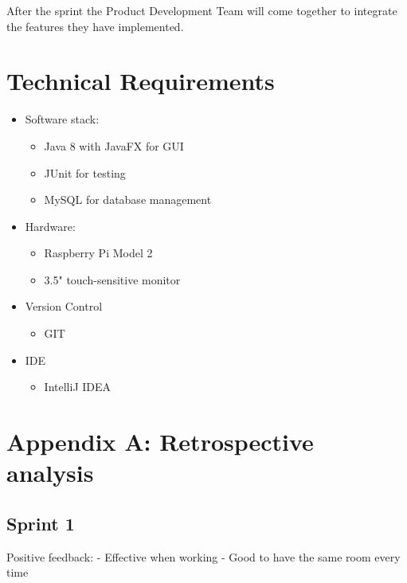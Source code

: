 \documentclass[a4paper,12pt]{article}
\begin{document}
After the sprint the Product Development Team will come together to integrate the features they have implemented.

\section{Technical Requirements}
\begin{itemize}
	\item Software stack:
	\begin{itemize}
		\item Java 8 with JavaFX for GUI
		\item JUnit for testing
		\item MySQL for database management
	\end{itemize}
	\item Hardware:
	\begin{itemize}
		\item Raspberry Pi Model 2
		\item 3.5" touch-sensitive monitor
	\end{itemize}
	\item Version Control
	\begin{itemize}
		\item GIT
	\end{itemize}
	\item IDE
	\begin{itemize}
		\item IntelliJ IDEA
	\end{itemize}
\end{itemize}

\section{Appendix A: Retrospective analysis}
\subsection{Sprint 1}
Positive feedback:
 - Effective when working
 - Good to have the same room every time
\end{document}
